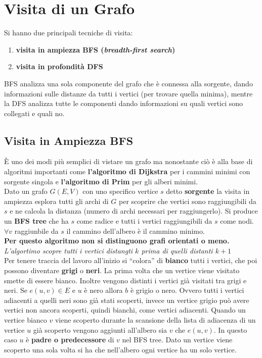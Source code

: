 \documentclass[a4paper,12pt, oneside]{book}
\begin{document}
\section{Visita di un Grafo}
Si hanno due principali tecniche di visita:
\begin{enumerate}
  \item \textbf{visita in ampiezza BFS (\textit{breadth-first search})}
  \item \textbf{visita in profondità DFS}
\end{enumerate}
BFS analizza una sola componente del grafo che è connessa alla
sorgente, dando informazioni sulle distanze da tutti i vertici (per
trovare quella minima), mentre la DFS analizza tutte le componenti
dando informazioni su quali vertici sono collegati e quali no.
\subsection{Visita in Ampiezza BFS}
È uno dei modi più semplici di vistare un grafo ma nonostante ciò è
alla base di algoritmi importanti come \textbf{l'algoritmo di
  Dijkstra} per i cammini minimi con sorgente singola e
\textbf{l'algoritmo di Prim} per gli alberi minimi.\\
Dato un grafo $G(E,V)$ con uno specifico vertice $s$ detto
\textbf{sorgente} la visita in ampiezza esplora tutti gli archi di $G$
per scoprire che vertici sono raggiungibili da $s$ e ne calcola la
distanza (numero di archi necessari per raggiungerlo). Si produce un
\textbf{BFS tree} che ha $s$ come radice e tutti i vertici
raggiungibili da $s$ come nodi. $\forall v$ raggiunbile da $s$ il
cammino dell'albero è il cammino minimo.\\
\textbf{Per questo algoritmo non si distinguono grafi orientati o
  meno.}\\
\textit{L'algortimo scopre tutti i vertici distangti $k$ prima di
  quelli distanti $k+1$}\\
Per tenere traccia del lavoro all'inizio si ``colora'' di
\textbf{bianco} tutti i vertici, che poi possono diventare
\textbf{grigi} o \textbf{neri}. La prima volta che un vertice viene
visitato smette di essere bianco. Inoltre vengono distinti i vertici
già visitati tra grigi e neri. Se $e(u,v)\in E$ e $u$ è nero allora
$b$ è grigio o nero. Ovvero tutti i vertici adiacenti a quelli neri
sono già stati scoperti, invece un vertice grigio può avere vertici
non ancora scoperti, quindi bianchi, come vertici adiacenti. Quando un
vertice bianco $v$ viene scoperto durante la scansione della lista
di adiacenza di un vertice $u$ già scoperto vengono aggiunti
all'albero sia $v$ che $e(u,v)$. In questo caso $u$ è \textbf{padre o
  predecessore} di $v$ nel BFS tree. Dato un vertice viene scoperto
una sola volta si ha che nell'albero ogni vertice ha un solo vertice.
\end{document}

